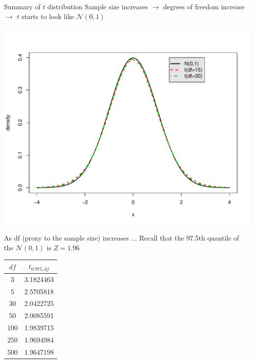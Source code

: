 \documentclass{beamer}\usepackage[]{graphicx}\usepackage[]{color}
\newenvironment{knitrout}{}{} %
\begin{document}
\begin{frame}{Summary of $t$ distribution}
Sample size increases $\rightarrow$ degrees of freedom increase $\rightarrow$ $t$ starts to look like $\mathcal{N}(0,1)$
\begin{knitrout}\scriptsize
{}\color{fgcolor}

{\centering \includegraphics[width=.6\linewidth]{figure/unnamed-chunk-3-1} 

}



\end{knitrout}
\end{frame}


\begin{frame}{As df (proxy to the sample size) increases $\ldots$}
Recall that the 97.5th quantile of the $\mathcal{N}(0,1)$ is $Z=1.96$ \pause
\begin{center}
\begin{tabular}{c|c}
$df$ & $t_{0.975,df}$\\
\hline
3 & 3.1824463\\
5 & 2.5705818\\
30 & 2.0422725\\
50 & 2.0085591\\
100 & 1.9839715\\
250 & 1.9694984\\
500 & 1.9647198
\end{tabular}
\end{center}

\end{frame}
\end{document}
